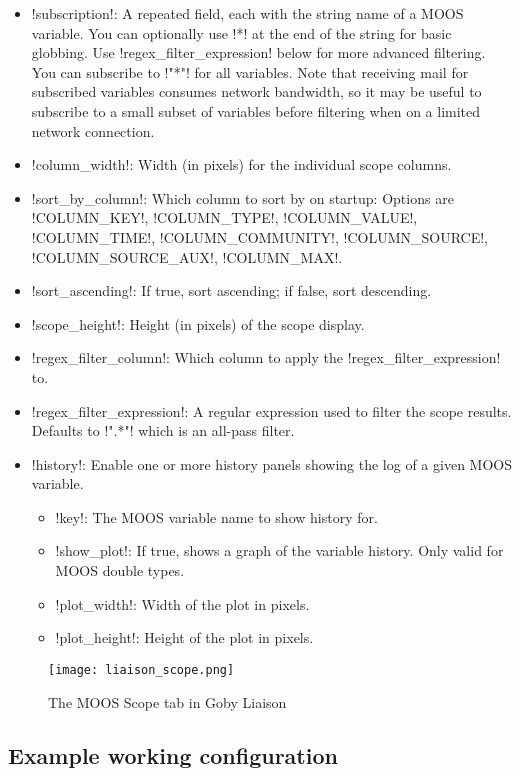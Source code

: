 \begin{itemize}
\item !subscription!: A repeated field, each with the string name of a MOOS variable. You can optionally use !*! at the end of the string for basic globbing. Use !regex_filter_expression! below for more advanced filtering. You can subscribe to !"*"! for all variables. Note that receiving mail for subscribed variables consumes network bandwidth, so it may be useful to subscribe to a small subset of variables before filtering when on a limited network connection.
\item !column_width!: Width (in pixels) for the individual scope columns.
\item !sort_by_column!: Which column to sort by on startup: Options are !COLUMN_KEY!, !COLUMN_TYPE!, !COLUMN_VALUE!, !COLUMN_TIME!, !COLUMN_COMMUNITY!, !COLUMN_SOURCE!, !COLUMN_SOURCE_AUX!, !COLUMN_MAX!.
\item !sort_ascending!: If true, sort ascending; if false, sort descending.
\item !scope_height!: Height (in pixels) of the scope display.
\item !regex_filter_column!: Which column to apply the !regex_filter_expression! to.
\item !regex_filter_expression!: A regular expression used to filter the scope results. Defaults to !".*"! which is an all-pass filter.
\item !history!: Enable one or more history panels showing the log of a given MOOS variable.
\begin{itemize}
\item !key!: The MOOS variable name to show history for.
\item !show_plot!: If true, shows a graph of the variable history. Only valid for MOOS double types.
\item !plot_width!: Width of the plot in pixels.
\item !plot_height!: Height of the plot in pixels.
\end{itemize}
\end{itemize}

\begin{figure}
\centering
\texttt{[image: liaison\_scope.png]}
\caption{The MOOS Scope tab in Goby Liaison}
\label{fig:liaison_scope}
\end{figure}

\subsection{Example working configuration}

